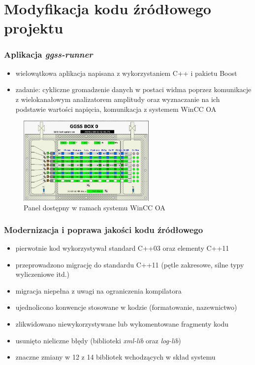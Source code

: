 \documentclass[10pt]{beamer}
\begin{document}
\section{Modyfikacja kodu źródłowego projektu}

\begin{frame}
\frametitle{Aplikacja \emph{ggss-runner}}
\begin{itemize}
    \item wielowątkowa aplikacja napisana z wykorzystaniem C++ i pakietu Boost
    \item zadanie: cykliczne gromadzenie danych w postaci widma poprzez komunikacje z wielokanałowym analizatorem amplitudy oraz wyznaczanie na ich podstawie wartości napięcia, komunikacja z systemem WinCC OA
\end{itemize}
\begin{figure}
\includegraphics[width=0.6\textwidth]{static/winccoa_panel.png}
\caption{Panel dostępny w ramach systemu WinCC OA}
\end{figure}
\end{frame}

\begin{frame}
\frametitle{Modernizacja i poprawa jakości kodu źródłowego}
\begin{itemize}
    \item pierwotnie kod wykorzystywał standard C++03 oraz elementy C++11
    \item przeprowadzono migrację do standardu C++11 (pętle zakresowe, silne typy wyliczeniowe itd.)
    \item migracja niepełna z uwagi na ograniczenia kompilatora
    \item ujednolicono konwencje stosowane w kodzie (formatowanie, nazewnictwo)
    \item zlikwidowano niewykorzystywane lub wykomentowane fragmenty kodu
    \item usunięto nieliczne błędy (biblioteki \emph{xml-lib} oraz \emph{log-lib})
    \item znaczne zmiany w 12 z 14 bibliotek wchodzących w skład systemu
\end{itemize}
\end{frame}
\end{document}
